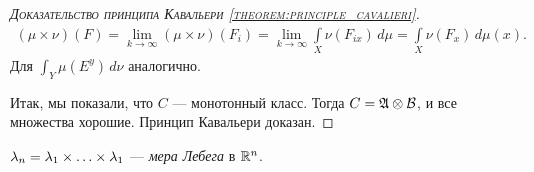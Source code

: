 \begin{proof}[\normalfont\textsc{Доказательство принципа Кавальери \ref{theorem:principle_cavalieri}}]
 \begin{align*}
  (\mu \times \nu)(F)  = \lim_{k \to \infty} (\mu \times \nu)(F_i) = \lim_{k \to \infty} \int\limits_{X} \nu(F_{ix}) \, d\mu = \int\limits_{X} \nu(F_x) \, d\mu(x)
 .\end{align*} Для $\int_{Y} \mu(E^{y}) \, d\nu  $ аналогично.

 Итак, мы показали, что $C$ --- монотонный класс. Тогда $C = \mathfrak{A} \otimes \mathcal{B}$, и все множества хорошие. Принцип Кавальери доказан.
\end{proof}
\begin{df}
 $\lambda_n = \lambda_1 \times \ldots \times \lambda_{1}$ --- \textit{мера Лебега} в $\mathbb{R}^{n}$.
\end{df}
